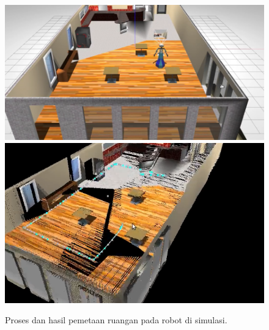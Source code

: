 \begin{figure}[ht]
  \centering
  \includegraphics[height=0.26\textwidth,keepaspectratio]{gambar/proses-pemetaan.png}
  \includegraphics[height=0.26\textwidth,keepaspectratio]{gambar/hasil-pemetaan.png}
  \caption{Proses dan hasil pemetaan ruangan pada robot di simulasi.}
  \label{fig:hasilpemetaan}
\end{figure}

